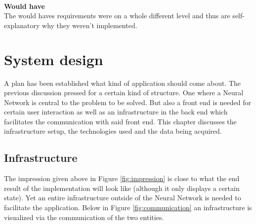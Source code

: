 \documentclass[a4paper,onecolumn]{report}
\begin{document}
\\
\textbf{Would have}\\
The would haves requirements were on a whole different level and thus are self-explanatory why they weren't implemented.

\chapter{System design}
\label{chap:softwarearchitecture}
A plan has been established what kind of application should come about. The previous discussion pressed for a certain kind of structure. One where a Neural Network is central to the problem to be solved. But also a front end is needed for certain user interaction as well as an infrastructure in the back end which facilitates the communication with said front end. This chapter discusses the infrastructure setup, the technologies used and the data being acquired.

\section{Infrastructure}
The impression given above in Figure \ref{fig:impression} is close to what the end result of the implementation will look like (although it only displays a certain state). Yet an entire infrastructure outside of the Neural Network is needed to facilitate the application. Below in Figure \ref{fig:communication} an infrastructure is visualized via the communication of the two entities.
\end{document}

